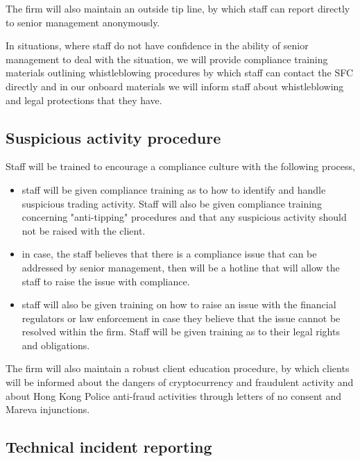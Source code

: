 The firm will also maintain an outside tip line, by which staff can
report directly to senior management anonymously.

In situations, where staff do not have confidence in the ability of
senior management to deal with the situation, we will provide
compliance training materials outlining whistleblowing procedures by
which staff can contact the SFC directly and in our onboard materials
we will inform staff about whistleblowing and legal protections that
they have.

\subsection{Suspicious activity procedure}

Staff will be trained to encourage a compliance culture with the
following process,
\begin{itemize}
  \item staff will be given compliance training as to how to identify
    and handle suspicious trading activity.  Staff will also be given
    compliance training concerning "anti-tipping" procedures and
    that any suspicious activity should not be raised with the client.
  \item in case, the staff believes that there is a compliance issue that
    can be addressed by senior management, then will be a hotline that
    will allow the staff to raise the issue with compliance.
  \item staff will also be given training on how to raise an issue
    with the financial regulators or law enforcement in case they
    believe that the issue cannot be resolved within the firm.  Staff
    will be given training as to their legal rights and obligations.
\end{itemize}

The firm will also maintain a robust client education procedure, by
which clients will be informed about the dangers of cryptocurrency and
fraudulent activity and about Hong Kong Police anti-fraud activities
through letters of no consent and Mareva injunctions.

\subsection{Technical incident reporting}
\label{label:techincident}

